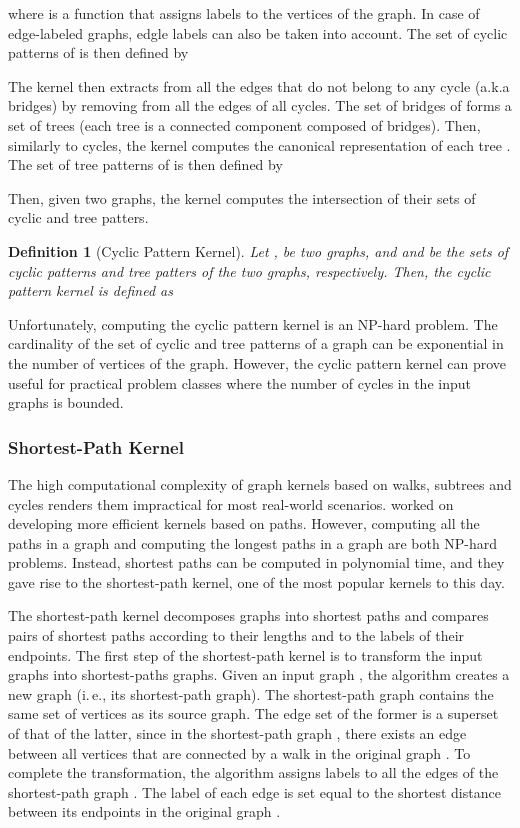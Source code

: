 \documentclass[twoside,11pt]{article}
\newcommand{\ie}{i.\,e., }
\newtheorem{definition}{Definition}
\begin{document}
where  is a function that assigns labels to the vertices of the graph.
In case of edge-labeled graphs, edgle labels can also be taken into account.
The set of cyclic patterns of  is then defined by


The kernel then extracts from  all the edges that do not belong to any cycle (a.k.a bridges) by removing from  all the edges of all cycles.
The set of bridges of  forms a set of trees (each tree is a connected component composed of bridges).
Then, similarly to cycles, the kernel computes the canonical representation  of each tree .
The set of tree patterns of  is then defined by

Then, given two graphs, the kernel computes the intersection of their sets of cyclic and tree patters.
\begin{definition}[Cyclic Pattern Kernel]
  Let ,  be two graphs, and  and  be the sets of cyclic patterns and tree patters of the two graphs, respectively.
  Then, the cyclic pattern kernel is defined as
  
\end{definition}
Unfortunately, computing the cyclic pattern kernel is an NP-hard problem.
The cardinality of the set of cyclic and tree patterns of a graph can be exponential in the number of vertices of the graph. 
However, the cyclic pattern kernel can prove useful for practical problem classes where the number of cycles in the input graphs is bounded.

\subsubsection{Shortest-Path Kernel}
The high computational complexity of graph kernels based on walks, subtrees and cycles renders them impractical for most real-world scenarios.
 worked on developing more efficient kernels based on paths.
However, computing all the paths in a graph and computing the longest paths in a graph are both NP-hard problems.
Instead, shortest paths can be computed in polynomial time, and they gave rise to the shortest-path kernel, one of the most popular kernels to this day.

The shortest-path kernel decomposes graphs into shortest paths and compares pairs of shortest paths according to their lengths and to the labels of their endpoints.
The first step of the shortest-path kernel is to transform the input graphs into shortest-paths graphs.
Given an input graph , the algorithm creates a new graph  (\ie its shortest-path graph).
The shortest-path graph  contains the same set of vertices as its source graph.
The edge set of the former is a superset of that of the latter, since in the shortest-path graph , there exists an edge between all vertices that are connected by a walk in the original graph .
To complete the transformation, the algorithm assigns labels to all the edges of the shortest-path graph .
The label of each edge is set equal to the shortest distance between its endpoints in the original graph .
\end{document}
